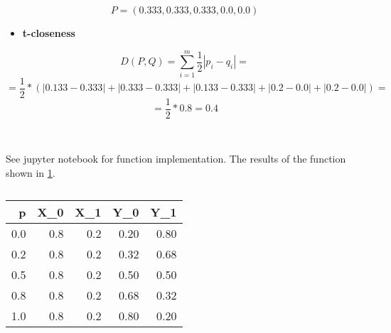 \documentclass[a4 paper]{article}
\numberwithin{equation}{section}
\newcommand{\problem}[2]{~\\\fbox{\textbf{Problem #1}}\newline\newline}
\newcommand{\0}{\mathbf{0}}
\begin{document}
$$
  P = (0.333, 0.333, 0.333, 0.0, 0.0)
$$

\begin{itemize}
    \item \textbf{t-closeness}
\end{itemize}

$$
D(P,Q) = \sum_{i=1}^m \frac{1}{2} | p_i - q_i | = 
$$
$$
= \frac{1}{2} * (|0.133 - 0.333| + |0.333 - 0.333| + |0.133 - 0.333| + |0.2-0.0| + |0.2 - 0.0|) = 
$$
$$
= \frac{1}{2} * 0.8 = 0.4
$$

\pagebreak

\problem{2}{}

See jupyter notebook for function implementation. The results of the function shown in \ref{tab:differential_privacy_results}.

\begin{table}[ht]
    \centering
    \begin{tabular}{rrrrr}
        \toprule
        \textbf{p} & \textbf{X\_0} & \textbf{X\_1} & \textbf{Y\_0} & \textbf{Y\_1} \\
        \midrule
        0.0 & 0.8 & 0.2 & 0.20 & 0.80 \\ \midrule
        0.2 & 0.8 & 0.2 & 0.32 & 0.68 \\ \midrule
        0.5 & 0.8 & 0.2 & 0.50 & 0.50 \\ \midrule
        0.8 & 0.8 & 0.2 & 0.68 & 0.32 \\ \midrule
        1.0 & 0.8 & 0.2 & 0.80 & 0.20 \\
        \bottomrule
    \end{tabular}
    \caption{}
    \label{tab:differential_privacy_results}
\end{table}
\end{document}
